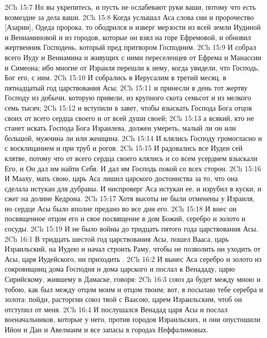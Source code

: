 \vs 2Ch 15:7 Но вы укрепитесь, и пусть не ослабевают руки ваши, потому что есть возмездие за дела ваши.
\rsbpar\vs 2Ch 15:8 Когда услышал Аса слова сии и пророчество [Азарии],  Одеда пророка, то ободрился и изверг мерзости  из всей земли Иудиной и Вениаминовой и из городов, которые он взял на горе Ефремовой, и обновил жертвенник Господень, который пред притвором Господним.
\vs 2Ch 15:9 И собрал всего Иуду и Вениамина и живущих с ними переселенцев от Ефрема и Манассии и Симеона; ибо многие от Израиля перешли к нему, когда увидели, что Господь, Бог его, с ним.
\vs 2Ch 15:10 И собрались в Иерусалим в третий месяц, в пятнадцатый год царствования Асы;
\vs 2Ch 15:11 и принесли в день тот жертву Господу из добычи, которую привели, из крупного скота семьсот и из мелкого семь тысяч;
\vs 2Ch 15:12 и вступили в завет, чтобы взыскать Господа Бога отцов своих от всего сердца своего и от всей души своей;
\vs 2Ch 15:13 а всякий, кто не станет искать Господа Бога Израилева, должен умереть, малый ли он или большой, мужчина ли или женщина.
\vs 2Ch 15:14 И клялись Господу громогласно и с восклицанием и при  труб и рогов.
\vs 2Ch 15:15 И радовались все Иудеи сей клятве, потому что от всего сердца своего клялись и со всем усердием взыскали Его, и Он дал им найти Себя. И дал им Господь покой со всех сторон.
\vs 2Ch 15:16 И Мааху, мать свою, царь Аса лишил царского достоинства за то, что она сделала истукан для дубравы. И ниспроверг Аса истукан ее, и изрубил в куски, и сжег на долине Кедрона.
\vs 2Ch 15:17 Хотя высоты не были отменены у Израиля, но сердце Асы было вполне предано  во все дни его.
\vs 2Ch 15:18 И внес он посвященное отцом его и свое посвящение в дом Божий, серебро и золото и сосуды.
\vs 2Ch 15:19 И не было войны до тридцать пятого года царствования Асы.
\vs 2Ch 16:1 В тридцать шестой год царствования Асы, пошел Вааса, царь Израильский, на Иудею и начал строить Раму, чтобы не позволить  ни уходить от Асы, царя Иудейского, ни приходить .
\vs 2Ch 16:2 И вынес Аса серебро и золото из сокровищниц дома Господня и дома царского и послал к Венададу, царю Сирийскому, жившему в Дамаске, говоря:
\vs 2Ch 16:3 союз да будет между мною и тобою, как был между отцом моим и отцом твоим; вот, я посылаю тебе серебра и золота: пойди, расторгни союз твой с Ваасою, царем Израильским, чтоб он отступил от меня.
\vs 2Ch 16:4 И послушался Венадад царя Асы и послал военачальников, которые  у него, против городов Израильских, и они опустошили Ийон и Дан и Авелмаим и все запасы в городах Неффалимовых.
